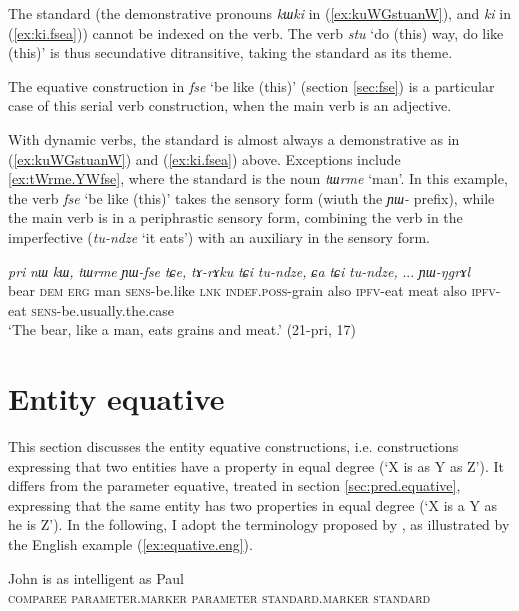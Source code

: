 \documentclass[oneside,a4paper,11pt]{article}
\newcommand{\ipa}[1]{{\phon\textit{#1}}}
\newcommand{\forme}[2]{\ipa{#1} `#2'}
\begin{document}
The standard (the demonstrative pronouns \ipa{kɯki} in (\ref{ex:kuWGstuanW}), and \ipa{ki} in (\ref{ex:ki.fsea})) cannot be indexed on the verb. The verb \forme{stu}{do (this) way, do like (this)} is thus secundative ditransitive, taking the standard as its theme. 

The equative construction in \ipa{fse} `be like (this)' (section \ref{sec:fse}) is a particular case of this serial verb construction, when the main verb is an adjective.

With dynamic verbs, the standard is almost always a demonstrative as in (\ref{ex:kuWGstuanW}) and (\ref{ex:ki.fsea}) above. Exceptions include \ref{ex:tWrme.YWfse}, where the standard is the noun \forme{tɯrme}{man}. In this example, the verb \forme{fse}{be like (this)} takes the sensory form (wiuth the \ipa{ɲɯ-} prefix), while the main verb is in a periphrastic sensory form, combining  the verb in the imperfective (\ipa{tu-ndze} `it eats') with an auxiliary in the sensory form.

\begin{exe}
\ex \label{ex:tWrme.YWfse}
\gll
\ipa{pri} 	\ipa{nɯ} 	\ipa{kɯ,} \ipa{tɯrme} 	\ipa{ɲɯ-fse} 	\ipa{tɕe,} 	\ipa{tɤ-rɤku} 	\ipa{tɕi} 	\ipa{tu-ndze,} 	\ipa{ɕa} 	\ipa{tɕi} 	\ipa{tu-ndze,} ... \ipa{ɲɯ-ŋgrɤl} \\
bear \textsc{dem} \textsc{erg} man \textsc{sens}-be.like \textsc{lnk} \textsc{indef.poss}-grain also \textsc{ipfv}-eat meat also \textsc{ipfv}-eat { } \textsc{sens}-be.usually.the.case \\
\glt `The bear, like a man, eats grains and meat.' (21-pri, 17)
\end{exe}

\section{Entity equative} \label{sec:arg.equative}
This section discusses the entity equative constructions, i.e. constructions expressing that two entities have a property in equal degree (`X is as Y as Z'). It differs from the parameter equative, treated in section \ref{sec:pred.equative}, expressing that the same entity has two properties in equal degree (`X is a Y as he is Z'). In the following, I adopt the terminology proposed by \citet{haspelmath08equative}, as illustrated by the English example (\ref{ex:equative.eng}). 

\begin{exe}
\ex \label{ex:equative.eng}
\gll  John is as intelligent as Paul \\
\textsc{comparee} { } \textsc{parameter.marker} \textsc{parameter} \textsc{standard.marker} \textsc{standard}  \\
\end{exe}
\end{document}
